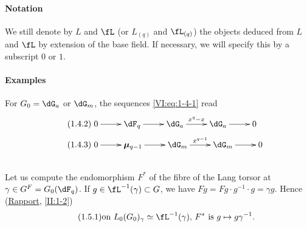 \paragraph{Notation}
We still denote by $L$ and $\fL$ (or $L_{(q)}$ and $\fL_{(q)}$) the objects deduced
from $L$ and $\fL$ by extension of the base field. If necessary, we
will specify this by a subscript $0$ or $1$.


\paragraph{Examples}
For $G_0=\dG_a$ or $\dG_m$, the sequences \eqref{VI:eq:1-4-1} read 
\begin{align*}\tag{1.4.2}\label{VI:eq:1-4-2}
&\xymatrix{
  0 \ar[r] 
    & \dF_q \ar[r] 
    & \dG_a \ar[r]^-{x^q-x} 
    & \dG_a \ar[r] 
    & 0 
} \\
\tag{1.4.3}\label{VI:eq:1-4-3}
&\xymatrix{
  0 \ar[r] 
    & \dmu_{q-1} \ar[r] 
    & \dG_m \ar[r]^-{x^{q-1}} 
    & \dG_m \ar[r] 
    & 0
}
\end{align*}





\subsection{}\label{VI:1-5}

Let us compute the endomorphism $F^\ast$ of the fibre of the Lang torsor at
$\gamma\in G^F=G_0(\dF_q)$. If $g\in \fL^{-1}(\gamma)\subset G$, we have
$F g = F g\cdot g^{-1}\cdot g = \gamma g$. Hence (\hyperref[II]{Rapport},
\ref{II:1-2}) 
\begin{equation*}\tag{1.5.1}\label{VI:eq:1-5-1}
  \text{on $L_0(G_0)_\gamma\simeq \fL^{-1}(\gamma)$, $F^\ast$ is $g\mapsto g\gamma^{-1}$.}
\end{equation*}





\subsection{}\label{VI:1-6}


